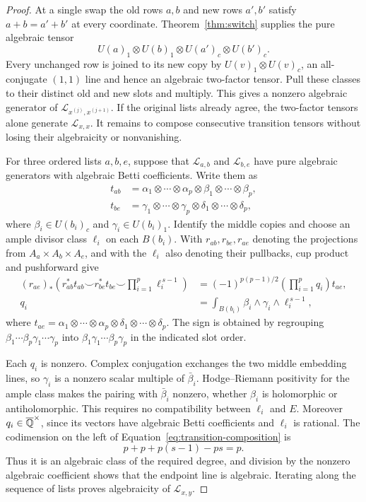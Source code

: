 \begin{proof}
At a single swap the old rows \(a,b\) and new rows \(a',b'\) satisfy
\(a+b=a'+b'\) at every coordinate.  Theorem~\ref{thm:switch} supplies
the pure algebraic tensor
\[
 U(a)_1\otimes U(b)_1\otimes U(a')_c\otimes U(b')_c.
\]
Every unchanged row is joined to its new copy by
\(U(v)_1\otimes U(v)_c\), an all-conjugate \((1,1)\) line and hence an
algebraic two-factor tensor.  Pull these classes to their distinct
old and new slots and multiply.  This gives a nonzero algebraic
generator of \(\mathscr L_{x^{(j)},x^{(j+1)}}\).  If the original
lists already agree, the two-factor tensors alone generate
\(\mathscr L_{x,x}\).  It remains to compose consecutive transition
tensors without losing their algebraicity or nonvanishing.

For three ordered lists \(a,b,e\), suppose that
\(\mathscr L_{a,b}\) and \(\mathscr L_{b,e}\) have pure algebraic
generators with algebraic Betti coefficients.  Write them as
\[
 \begin{split}
 t_{ab}&=\alpha_1\otimes\cdots\otimes\alpha_p\otimes
          \beta_1\otimes\cdots\otimes\beta_p,\\
 t_{be}&=\gamma_1\otimes\cdots\otimes\gamma_p\otimes
          \delta_1\otimes\cdots\otimes\delta_p,
 \end{split}
\]
where \(\beta_i\in U(b_i)_c\) and \(\gamma_i\in U(b_i)_1\).  Identify the
middle copies and choose an ample divisor class \(\ell_i\) on each
\(B(b_i)\).  With \(r_{ab},r_{be},r_{ae}\) denoting the projections
from \(A_a\times A_b\times A_e\), and with the \(\ell_i\) also denoting
their pullbacks, cup product and pushforward give
\begin{equation}\label{eq:transition-composition}
 \begin{split}
 (r_{ae})_*\left(
 r_{ab}^*t_{ab}\smile r_{be}^*t_{be}
       \smile\prod_{i=1}^p\ell_i^{\,s-1}\right)
 &=
 (-1)^{p(p-1)/2}\left(\prod_{i=1}^p q_i\right)t_{ae},\\
 q_i&=\int_{B(b_i)}\beta_i\wedge\gamma_i\wedge\ell_i^{\,s-1},
 \end{split}
\end{equation}
where \(t_{ae}=\alpha_1\otimes\cdots\otimes\alpha_p\otimes
\delta_1\otimes\cdots\otimes\delta_p\).  The sign is obtained by regrouping
\(\beta_1\cdots\beta_p\gamma_1\cdots\gamma_p\) into
\(\beta_1\gamma_1\cdots\beta_p\gamma_p\) in the indicated slot order.

Each \(q_i\) is nonzero.  Complex conjugation exchanges the two
middle embedding lines, so \(\gamma_i\) is a nonzero scalar multiple of
\(\bar\beta_i\).  Hodge--Riemann positivity for the ample class makes
the pairing with \(\bar\beta_i\) nonzero, whether \(\beta_i\) is holomorphic
or antiholomorphic.  This requires no compatibility between \(\ell_i\)
and \(E\).  Moreover \(q_i\in\overline{\mathbb{Q}}^\times\), since its vectors have
algebraic Betti coefficients and \(\ell_i\) is rational.  The
codimension on the left of Equation~\eqref{eq:transition-composition}
is
\[
 p+p+p(s-1)-ps=p.
\]
Thus it is an algebraic class of the required degree, and division by
the nonzero algebraic coefficient shows that the endpoint line is
algebraic.  Iterating along the sequence of lists proves algebraicity
of \(\mathscr L_{x,y}\).


\end{proof}
